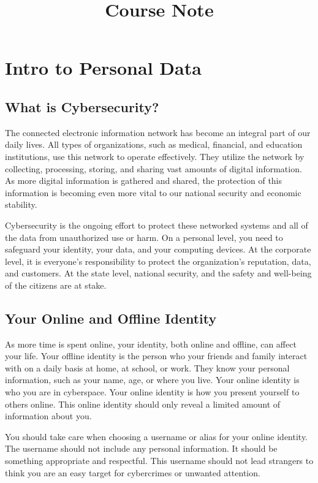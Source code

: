 \documentclass{article}
\begin{document}
\title{Course Note}
\maketitle
\section{Intro to Personal Data}
\subsection{What is Cybersecurity?}
The connected electronic information network has become an integral part of our daily lives. All types of organizations, such as medical, financial, and education institutions, use this network to operate effectively. They utilize the network by collecting, processing, storing, and sharing vast amounts of digital information. As more digital information is gathered and shared, the protection of this information is becoming even more vital to our national security and economic stability.

Cybersecurity is the ongoing effort to protect these networked systems and all of the data from unauthorized use or harm. On a personal level, you need to safeguard your identity, your data, and your computing devices. At the corporate level, it is everyone’s responsibility to protect the organization’s reputation, data, and customers. At the state level, national security, and the safety and well-being of the citizens are at stake.

\subsection{Your Online and Offline Identity}

As more time is spent online, your identity, both online and offline, can affect your life. Your offline identity is the person who your friends and family interact with on a daily basis at home, at school, or work. They know your personal information, such as your name, age, or where you live. Your online identity is who you are in cyberspace. Your online identity is how you present yourself to others online. This online identity should only reveal a limited amount of information about you.

You should take care when choosing a username or alias for your online identity. The username should not include any personal information. It should be something appropriate and respectful. This username should not lead strangers to think you are an easy target for cybercrimes or unwanted attention.
\end{document}
